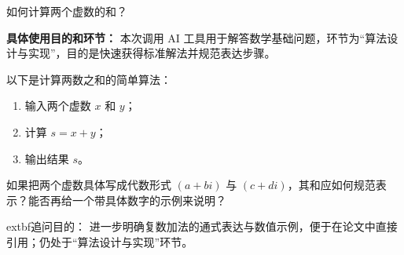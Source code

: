 \begin{tcolorbox}[colback=orange!10, colframe=orange!60, title={\textcolor{black}{用户提问}}]
如何计算两个虚数的和？
\vspace{0.5em}
\begin{flushright}
    \scriptsize
    \begin{flushleft}
        \textbf{具体使用目的和环节：} 本次调用 AI 工具用于解答数学基础问题，环节为“算法设计与实现”，目的是快速获得标准解法并规范表达步骤。
    \end{flushleft}
\end{flushright}
\end{tcolorbox}


\begin{GeminiBlock}
以下是计算两数之和的简单算法：
\begin{enumerate}
    \item 输入两个虚数 $x$ 和 $y$；
    \item 计算 $s = x + y$；
    \item 输出结果 $s$。
\end{enumerate}
\end{GeminiBlock}

\begin{tcolorbox}[colback=orange!10, colframe=orange!60, title={\textcolor{black}{用户追问}}]
如果把两个虚数具体写成代数形式 $(a+bi)$ 与 $(c+di)$，其和应如何规范表示？能否再给一个带具体数字的示例来说明？
\vspace{0.5em}
\begin{flushright}
    \scriptsize
    \begin{flushleft}
        	extbf{追问目的：} 进一步明确复数加法的通式表达与数值示例，便于在论文中直接引用；仍处于“算法设计与实现”环节。
    \end{flushleft}
\end{flushright}
\end{tcolorbox}

